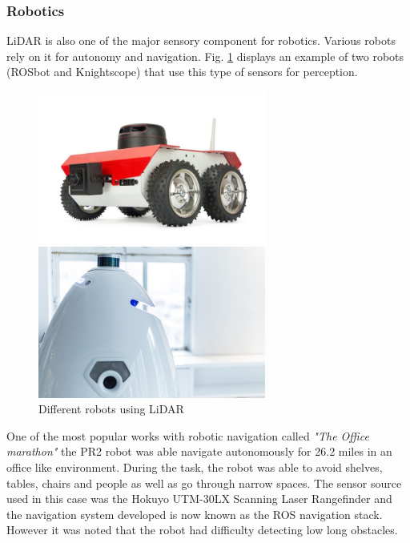 \subsubsection{Robotics}
\ac{LiDAR} is also one of the major sensory component for robotics. Various robots rely on it for autonomy and navigation. Fig. \ref{fig:robotslidar} displays an example of two robots (ROSbot and Knightscope) that use this type of sensors for perception.
\begin{figure}[h] 
    \begin{minipage}[b]{.49\linewidth}
        \includegraphics[height=5cm,width=\linewidth]{imgs/chapter2/robot1.jpg}
    \end{minipage}
    \begin{minipage}[b]{.49\linewidth}
        \includegraphics[height=5cm,width=\linewidth]{imgs/chapter2/robot2.jpg}
    \end{minipage}
    \caption{Different robots using \ac{LiDAR}}
    \label{fig:robotslidar}
\end{figure}


One of the most popular works with robotic navigation called \textit{"The Office marathon"} \cite{marder2010office}  the PR2 robot was able navigate autonomously for 26.2 miles in an office like environment. During the task, the robot was able to avoid  shelves, tables, chairs and people as well as go
through narrow spaces. The sensor source used in this case was the Hokuyo UTM-30LX Scanning Laser Rangefinder and the navigation system developed is now known as the \ac{ROS} navigation stack. However it was noted that the robot had difficulty detecting low long obstacles.


